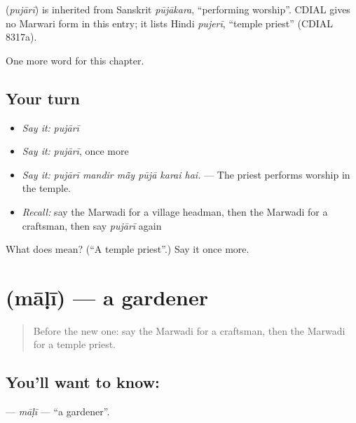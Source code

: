 \begin{cousinweb}
\textbf{} (\emph{pujārī}) is inherited from Sanskrit \emph{pūjākara}, \textquotedblleft{}performing worship\textquotedblright{}. CDIAL gives no Marwari form in this entry; it lists Hindi \emph{pujerī}, \textquotedblleft{}temple priest\textquotedblright{} (CDIAL 8317a).
\end{cousinweb}

\begin{grammarlens}[title={What you've built}]
One more word for this chapter.
\end{grammarlens}

\subsection*{Your turn}
\begin{itemize}
\raggedright
  \item \emph{Say it:} \emph{pujārī}
  \item \emph{Say it:} \emph{pujārī}, once more
  \item \emph{Say it:} \emph{pujārī mandir mā̃y pūjā karai hai.} — The priest performs worship in the temple.
  \item \emph{Recall:} say the Marwadi for a village headman, then the Marwadi for a craftsman, then say \emph{pujārī} again
\end{itemize}

\begin{tcolorbox}[breakable,colback=teal!4,colframe=teal!35!black,title={Before you move on}]
What does  mean? (\textquotedblleft{}A temple priest\textquotedblright{}.) Say it once more.
\end{tcolorbox}
\section[\texorpdfstring{\mw{माळी} (māḷī)}{माळी (māḷī)}]{ (māḷī) — a gardener}

\label{lesson:MW-C263-mali}



\begin{quote}
Before the new one: say the Marwadi for a craftsman, then the Marwadi for a temple priest.
\end{quote}

\subsection*{You'll want to know: }
\textbf{} — \emph{māḷī} — \textquotedblleft{}a gardener\textquotedblright{}.

